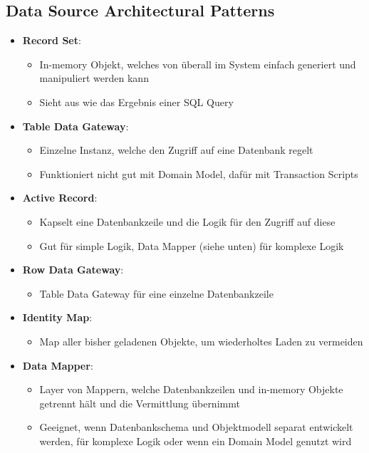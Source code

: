 \subsection{Data Source Architectural Patterns}
\label{eap:sub:data_source_architectural_patterns}


\begin{itemize}
	\item \textbf{Record Set}:
	\begin{itemize}
		\item In-memory Objekt, welches von überall im System einfach generiert und manipuliert werden kann
		\item Sieht aus wie das Ergebnis einer SQL Query
	\end{itemize}
	\item \textbf{Table Data Gateway}:
	\begin{itemize}
		\item Einzelne Instanz, welche den Zugriff auf eine Datenbank regelt
		\item Funktioniert nicht gut mit Domain Model, dafür mit Transaction Scripts
	\end{itemize}
	\item \textbf{Active Record}:
	\begin{itemize}
		\item Kapselt eine Datenbankzeile und die Logik für den Zugriff auf diese
		\item Gut für simple Logik, Data Mapper (siehe unten) für komplexe Logik
	\end{itemize}
	\item \textbf{Row Data Gateway}:
	\begin{itemize}
		\item Table Data Gateway für eine einzelne Datenbankzeile
	\end{itemize}
	\newpage
	\item \textbf{Identity Map}:
	\begin{itemize}
		\item Map aller bisher geladenen Objekte, um wiederholtes Laden zu vermeiden
	\end{itemize}
	\item \textbf{Data Mapper}:
	\begin{itemize}
		\item Layer von Mappern, welche Datenbankzeilen und in-memory Objekte getrennt hält und die Vermittlung übernimmt
		\item Geeignet, wenn Datenbankschema und Objektmodell separat entwickelt werden, für komplexe Logik oder wenn ein Domain Model genutzt wird
	\end{itemize}
\end{itemize}

